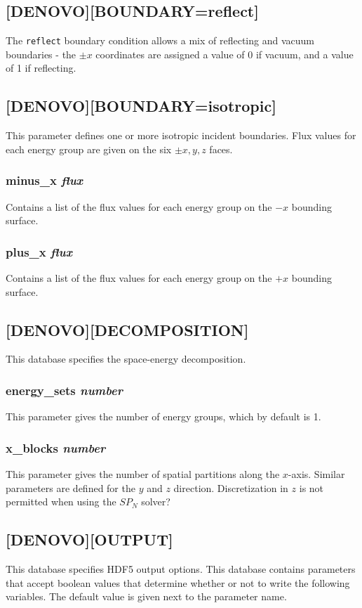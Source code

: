 \documentclass[10pt]{article}
\begin{document}
\subsection{[DENOVO][BOUNDARY=reflect]}
The \texttt{reflect} boundary condition allows a mix of reflecting and vacuum boundaries - the \(\pm x\) coordinates are assigned a value of 0 if vacuum, and a value of 1 if reflecting.

\subsection{[DENOVO][BOUNDARY=isotropic]}
This parameter defines one or more isotropic incident boundaries. Flux values for each energy group are given on the six \(\pm x, y, z\) faces.

\subsubsection{minus\_x \textit{flux}}
Contains a list of the flux values for each energy group on the \(-x\) bounding surface. 

\subsubsection{plus\_x \textit{flux}}
Contains a list of the flux values for each energy group on the \(+x\) bounding surface. 


\subsection{[DENOVO][DECOMPOSITION]}
This database specifies the space-energy decomposition.

\subsubsection{energy\_sets \textit{number}}
This parameter gives the number of energy groups, which by default is 1.

\subsubsection{x\_blocks \textit{number}}
This parameter gives the number of spatial partitions along the \(x\)-axis. Similar parameters are defined for the \(y\) and \(z\) direction. Discretization in \(z\) is not permitted when using the \(SP_N\) solver?

\subsection{[DENOVO][OUTPUT]}
This database specifies HDF5 output options. This database contains parameters that accept boolean values that determine whether or not to write the following variables. The default value is given next to the parameter name.\newline
\end{document}
